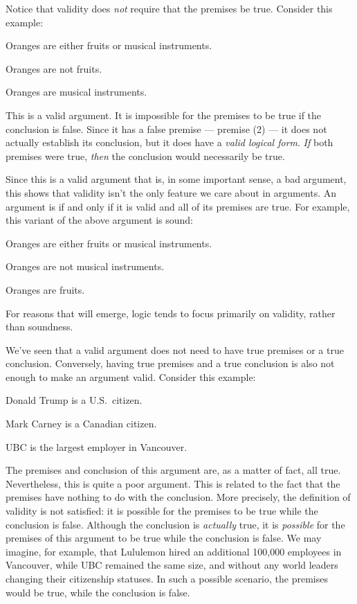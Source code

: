Notice that validity does \emph{not} require that the premises be true. Consider this example:

\begin{earg}
\item[(1)] Oranges are either fruits or musical instruments.
\item[(2)] Oranges are not fruits.
\item[\therefore] Oranges are musical instruments.
\end{earg}

This is a valid argument. It is impossible for the premises to be true if the conclusion is false. Since it has a false premise --- premise (2) --- it does not actually establish its conclusion, but it does have a \emph{valid logical form}. \emph{If} both premises were true, \emph{then} the conclusion would necessarily be true.

Since this is a valid argument that is, in some important sense, a bad argument, this shows that validity isn't the only feature we care about in arguments. An argument is  if and only if it is valid and all of its premises are true. For example, this variant of the above argument is sound:

\begin{earg}
\item[(1)] Oranges are either fruits or musical instruments.
\item[(2)] Oranges are not musical instruments.
\item[\therefore] Oranges are fruits.
\end{earg}

 For reasons that will emerge, logic tends to focus primarily on validity, rather than soundness.

We've seen that a valid argument does not need to have true premises or a true conclusion. Conversely, having true premises and a true conclusion is also not enough to make an argument valid. Consider this example:

\begin{earg}
\item[] Donald Trump is a U.S.\ citizen.
\item[] Mark Carney is a Canadian citizen.
\item[\therefore] UBC is the largest employer in Vancouver.
\end{earg}

The premises and conclusion of this argument are, as a matter of fact, all true. Nevertheless, this is quite a poor argument. This is related to the fact that the premises have nothing to do with the conclusion. More precisely, the definition of validity is not satisfied: it is possible for the premises to be true while the conclusion is false. Although the conclusion is \emph{actually} true, it is \emph{possible} for the premises of this argument to be true while the conclusion is false. We may imagine, for example, that Lululemon hired an additional 100,000 employees in Vancouver, while UBC remained the same size, and without any world leaders changing their citizenship statuses. In such a possible scenario, the premises would be true, while the conclusion is false.

